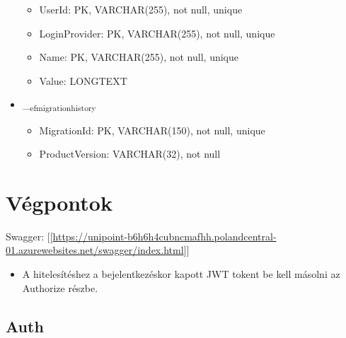 \documentclass[11pt]{article}
\begin{document}
\begin{itemize}
\begin{itemize}
\item UserId: PK, VARCHAR(255), not null, unique
\item LoginProvider: PK, VARCHAR(255), not null, unique
\item Name: PK, VARCHAR(255), not null, unique
\item Value: LONGTEXT
\end{itemize}
\item \_\textsubscript{efmigrationhistory}
\begin{itemize}
\item MigrationId: PK, VARCHAR(150), not null, unique
\item ProductVersion: VARCHAR(32), not null
\end{itemize}
\end{itemize}
\section{Végpontok}
\label{sec:org5d440d6}
Swagger: [[\url{https://unipoint-b6h6h4cubncmafhh.polandcentral-01.azurewebsites.net/swagger/index.html}]]
\begin{itemize}
\item A hitelesítéshez a bejelentkezéskor kapott JWT tokent be kell másolni az Authorize részbe.
\end{itemize}
\subsection{Auth}
\label{sec:org48d3d36}
\end{document}
